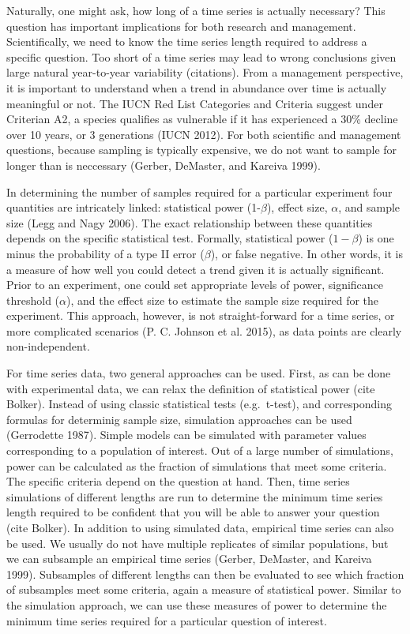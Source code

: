 \documentclass[12pt,]{article}
\begin{document}
Naturally, one might ask, how long of a time series is actually
necessary? This question has important implications for both research
and management. Scientifically, we need to know the time series length
required to address a specific question. Too short of a time series may
lead to wrong conclusions given large natural year-to-year variability
(citations). From a management perspective, it is important to
understand when a trend in abundance over time is actually meaningful or
not. The IUCN Red List Categories and Criteria suggest under Criterian
A2, a species qualifies as vulnerable if it has experienced a 30\%
decline over 10 years, or 3 generations (IUCN 2012). For both scientific
and management questions, because sampling is typically expensive, we do
not want to sample for longer than is neccessary (Gerber, DeMaster, and
Kareiva 1999).

In determining the number of samples required for a particular
experiment four quantities are intricately linked: statistical power
(1-\(\beta\)), effect size, \(\alpha\), and sample size (Legg and Nagy
2006). The exact relationship between these quantities depends on the
specific statistical test. Formally, statistical power (\(1-\beta\)) is
one minus the probability of a type II error (\(\beta\)), or false
negative. In other words, it is a measure of how well you could detect a
trend given it is actually significant. Prior to an experiment, one
could set appropriate levels of power, significance threshold
(\(\alpha\)), and the effect size to estimate the sample size required
for the experiment. This approach, however, is not straight-forward for
a time series, or more complicated scenarios (P. C. Johnson et al.
2015), as data points are clearly non-independent.

For time series data, two general approaches can be used. First, as can
be done with experimental data, we can relax the definition of
statistical power (cite Bolker). Instead of using classic statistical
tests (e.g.~t-test), and corresponding formulas for determinig sample
size, simulation approaches can be used (Gerrodette 1987). Simple models
can be simulated with parameter values corresponding to a population of
interest. Out of a large number of simulations, power can be calculated
as the fraction of simulations that meet some criteria. The specific
criteria depend on the question at hand. Then, time series simulations
of different lengths are run to determine the minimum time series length
required to be confident that you will be able to answer your question
(cite Bolker). In addition to using simulated data, empirical time
series can also be used. We usually do not have multiple replicates of
similar populations, but we can subsample an empirical time series
(Gerber, DeMaster, and Kareiva 1999). Subsamples of different lengths
can then be evaluated to see which fraction of subsamples meet some
criteria, again a measure of statistical power. Similar to the
simulation approach, we can use these measures of power to determine the
minimum time series required for a particular question of interest.
\end{document}
